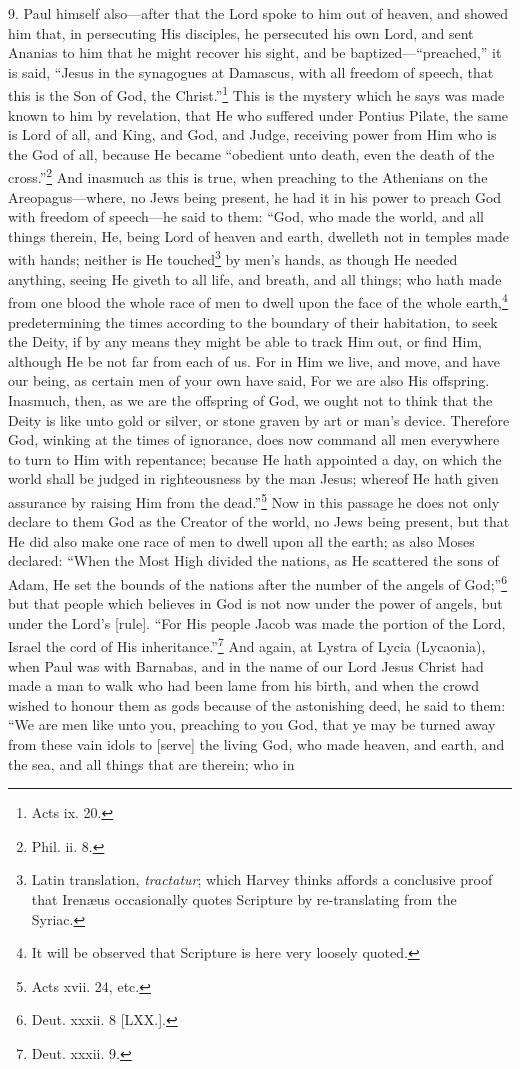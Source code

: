 9. Paul himself also—after that the Lord spoke to him out of heaven, and showed him that, in persecuting His disciples, he persecuted his own Lord, and sent Ananias to him that he might recover his sight, and be baptized—“preached,” it is said, “Jesus in the synagogues at Damascus, with all freedom of speech, that this is the Son of God, the Christ.”\footnote{Acts ix. 20.} This is the mystery which he says was made known to him by revelation, that He who suffered under Pontius Pilate, the same is Lord of all, and King, and God, and Judge, receiving power from Him who is the God of all, because He became “obedient unto death, even the death of the cross.”\footnote{Phil. ii. 8.} And inasmuch as this is true, when preaching to the Athenians on the Areopagus—where, no Jews being present, he had it in his power to preach God with freedom of speech—he said to them: “God, who made the world, and all things therein, He, being Lord of heaven and earth, dwelleth not in temples made with hands; neither is He touched\footnote{Latin translation, \emph{tractatur}; which Harvey thinks affords a conclusive proof that Irenæus occasionally quotes Scripture by re-translating from the Syriac.} by men’s hands, as though He needed anything, seeing He giveth to all life, and breath, and all things; who hath made from one blood the whole race of men to dwell upon the face of the whole earth,\footnote{It will be observed that Scripture is here very loosely quoted.} predetermining the times according to the boundary of their habitation, to seek the Deity, if by any means they might be able to track Him out, or find Him, although He be not far from each of us. For in Him we live, and move, and have our being, as certain men of your own have said, For we are also His offspring. Inasmuch, then, as we are the offspring of God, we ought not to think that the Deity is like unto gold or silver, or stone graven by art or man’s device. Therefore God, winking at the times of ignorance, does now command all men everywhere to turn to Him with repentance; because He hath appointed a day, on which the world shall be judged in righteousness by the man Jesus; whereof He hath given assurance by raising Him from the dead.”\footnote{Acts xvii. 24, etc.} Now in this passage he does not only declare to them God as the Creator of the world, no Jews being present, but that He did also make one race of men to dwell upon all the earth; as also Moses declared: “When the Most High divided the nations, as He scattered the sons of Adam, He set the bounds of the nations after the number of the angels of God;”\footnote{Deut. xxxii. 8 [LXX.].} but  that people which believes in God is not now under the power of angels, but under the Lord’s [rule]. “For His people Jacob was made the portion of the Lord, Israel the cord of His inheritance.”\footnote{Deut. xxxii. 9.} And again, at Lystra of Lycia (Lycaonia), when Paul was with Barnabas, and in the name of our Lord Jesus Christ had made a man to walk who had been lame from his birth, and when the crowd wished to honour them as gods because of the astonishing deed, he said to them: “We are men like unto you, preaching to you God, that ye may be turned away from these vain idols to [serve] the living God, who made heaven, and earth, and the sea, and all things that are therein; who in 